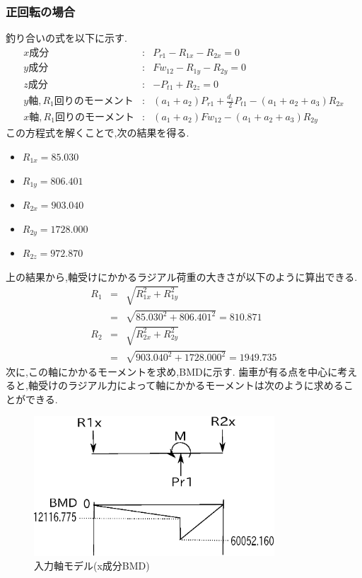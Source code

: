 \subsubsection{正回転の場合}
釣り合いの式を以下に示す.
\begin{eqnarray}
x成分&:&P_{r1}-R_{1x}-R_{2x}=0\\
y成分&:&Fw_{12}-R_{1y}-R_{2y}=0\\
z成分&:&-P_{t1}+R_{2z}=0\\
y軸,R_1回りのモーメント&:&(a_1+a_2)P_{r1}+\frac{d_1}{2}P_{t1}-(a_1+a_2+a_3)R_{2x}\\
x軸,R_1回りのモーメント&:&(a_1+a_2)Fw_{12}-(a_1+a_2+a_3)R_{2y}
\end{eqnarray}
この方程式を解くことで,次の結果を得る.
\begin{itemize}
\item $R_{1x}=85.030$
\item $R_{1y}=806.401$
\item $R_{2x}=903.040$
\item $R_{2y}=1728.000$
\item $R_{2z}=972.870$
\end{itemize}
上の結果から,軸受けにかかるラジアル荷重の大きさが以下のように算出できる.
\begin{eqnarray}
R_1 &=& \sqrt {R_{1x}^2+R_{1y}^2}\\
    &=& \sqrt {85.030^2+806.401^2}=810.871\\
R_2 &=& \sqrt {R_{2x}^2+R_{2y}^2}\\
    &=& \sqrt {903.040^2+1728.000^2}=1949.735
\end{eqnarray}
次に,この軸にかかるモーメントを求め,BMDに示す.
歯車が有る点を中心に考えると,軸受けのラジアル力によって軸にかかるモーメントは次のように求めることができる.
\begin{figure}[htbp]
\begin{center}
\includegraphics[width=9cm]{../picture/jiku14.eps}
\end{center}
\caption{入力軸モデル(x成分BMD)}
\end{figure}
